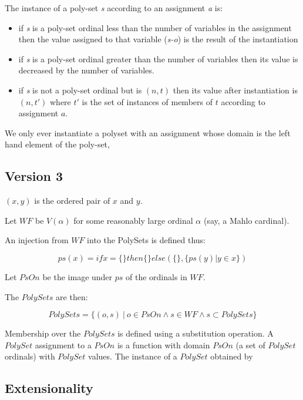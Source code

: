 \documentclass[numreferences]{rbjk}
\begin{document}
\begin{article}
The instance of a poly-set \emph{s} according to an assignment \emph{a} is:
\begin{itemize}
\item if \emph{s} is a poly-set ordinal less than the number of variables in the assignment then the value assigned to that variable (\emph{s-o}) is the result of the instantiation
\item if \emph{s} is a poly-set ordinal greater than the number of variables then its value is decreased by the number of variables.
\item if \emph{s} is not a poly-set ordinal but is $(n,t)$ then its value after instantiation is $(n,t')$ where $t'$ is the set of instances of members of $t$ according to assignment $a$.
\end{itemize}

We only ever instantiate a polyset with an assignment whose domain is the left hand element of the poly-set,

\subsection{Version 3}

$(x,y)$ is the ordered pair of $x$ and $y$.

Let $WF$ be $V(\alpha)$ for some reasonably large ordinal $\alpha$ (say, a Mahlo cardinal).

An injection from $WF$ into the PolySets is defined thus:

\begin{displaymath}
ps(x) = if x = \{\} then \{\} else (\{\},\{ ps(y) | y \in x\})
\end{displaymath}

Let $PsOn$ be the image under $ps$ of the ordinals in $WF$.

The $PolySets$ are then:

\begin{displaymath}
PolySets = \{(o,s)\ |\ o \in PsOn \land s \in WF \land s \subset PolySets\}
\end{displaymath}

Membership over the $PolySets$ is defined using a substitution operation.
A $PolySet$ assignment to a $PsOn$ is a function with domain $PsOn$ (a set of $PolySet$ ordinals) with $PolySet$ values.
The instance of a $PolySet$ obtained by 

\subsection{Extensionality}


\end{article}
\end{document}
